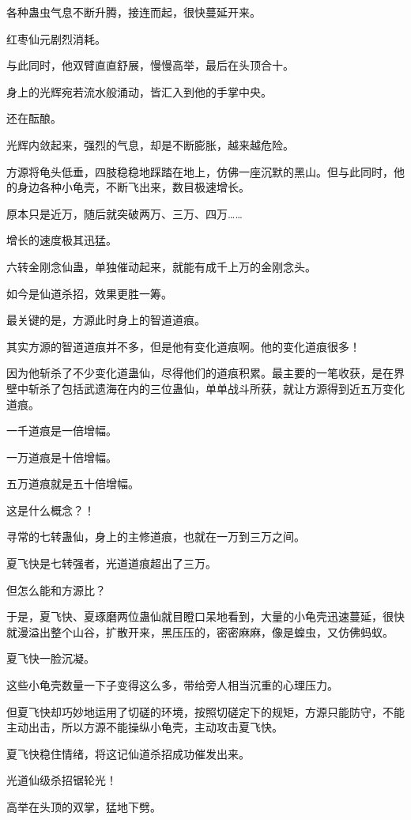 \begin{this_body}
各种蛊虫气息不断升腾，接连而起，很快蔓延开来。

红枣仙元剧烈消耗。

与此同时，他双臂直直舒展，慢慢高举，最后在头顶合十。

身上的光辉宛若流水般涌动，皆汇入到他的手掌中央。

还在酝酿。

光辉内敛起来，强烈的气息，却是不断膨胀，越来越危险。

方源将龟头低垂，四肢稳稳地踩踏在地上，仿佛一座沉默的黑山。但与此同时，他的身边各种小龟壳，不断飞出来，数目极速增长。

原本只是近万，随后就突破两万、三万、四万……

增长的速度极其迅猛。

六转金刚念仙蛊，单独催动起来，就能有成千上万的金刚念头。

如今是仙道杀招，效果更胜一筹。

最关键的是，方源此时身上的智道道痕。

其实方源的智道道痕并不多，但是他有变化道痕啊。他的变化道痕很多！

因为他斩杀了不少变化道蛊仙，尽得他们的道痕积累。最主要的一笔收获，是在界壁中斩杀了包括武遗海在内的三位蛊仙，单单战斗所获，就让方源得到近五万变化道痕。

一千道痕是一倍增幅。

一万道痕是十倍增幅。

五万道痕就是五十倍增幅。

这是什么概念？！

寻常的七转蛊仙，身上的主修道痕，也就在一万到三万之间。

夏飞快是七转强者，光道道痕超出了三万。

但怎么能和方源比？

于是，夏飞快、夏琢磨两位蛊仙就目瞪口呆地看到，大量的小龟壳迅速蔓延，很快就漫溢出整个山谷，扩散开来，黑压压的，密密麻麻，像是蝗虫，又仿佛蚂蚁。

夏飞快一脸沉凝。

这些小龟壳数量一下子变得这么多，带给旁人相当沉重的心理压力。

但夏飞快却巧妙地运用了切磋的环境，按照切磋定下的规矩，方源只能防守，不能主动出击，所以方源不能操纵小龟壳，主动攻击夏飞快。

夏飞快稳住情绪，将这记仙道杀招成功催发出来。

光道仙级杀招锯轮光！

高举在头顶的双掌，猛地下劈。


\end{this_body}

